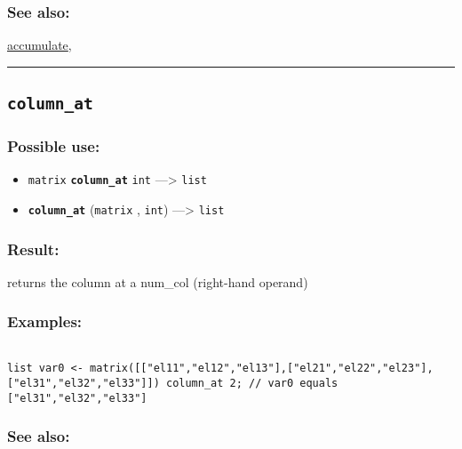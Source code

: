 \documentclass[]{book}
\providecommand{\tightlist}{%
  \setlength{\itemsep}{0pt}\setlength{\parskip}{0pt}}
\theoremstyle{definition}
\theoremstyle{definition}
\theoremstyle{definition}
\theoremstyle{remark}
\begin{document}
\subsubsection{See also:}\label{see-also-55}

\href{OperatorsAA\#accumulate}{accumulate},

\begin{center}\rule{0.5\linewidth}{\linethickness}\end{center}

\subsection{\texorpdfstring{\texttt{column\_at}}{column\_at}}\label{column_at}

\subsubsection{Possible use:}\label{possible-use-91}

\begin{itemize}
\tightlist
\item
  \texttt{matrix} \textbf{\texttt{column\_at}} \texttt{int}
  ---\textgreater{} \texttt{list}
\item
  \textbf{\texttt{column\_at}} (\texttt{matrix} , \texttt{int})
  ---\textgreater{} \texttt{list}
\end{itemize}

\subsubsection{Result:}\label{result-89}

returns the column at a num\_col (right-hand operand)

\subsubsection{Examples:}\label{examples-70}

\begin{verbatim}
 
list var0 <- matrix([["el11","el12","el13"],["el21","el22","el23"],["el31","el32","el33"]]) column_at 2; // var0 equals ["el31","el32","el33"]
\end{verbatim}

\subsubsection{See also:}\label{see-also-56}
\end{document}
